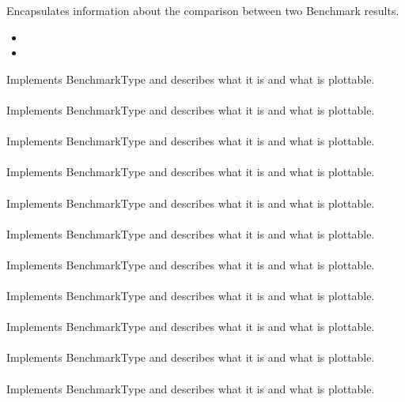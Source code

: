 {Encapsulates information about the comparison between two Benchmark results.}
{
  \begin{itemize}
    \item {}
    \item {}
  \end{itemize}
}

{Implements BenchmarkType and describes what it is and what is plottable.}
{\\}{\\}
{Implements BenchmarkType and describes what it is and what is plottable.}
{\\}{\\}
{Implements BenchmarkType and describes what it is and what is plottable.}
{\\}{\\}
{Implements BenchmarkType and describes what it is and what is plottable.}
{\\}{\\}
{Implements BenchmarkType and describes what it is and what is plottable.}
{\\}{\\}
{Implements BenchmarkType and describes what it is and what is plottable.}
{\\}{\\}
{Implements BenchmarkType and describes what it is and what is plottable.}
{\\}{\\}
{Implements BenchmarkType and describes what it is and what is plottable.}
{\\}{\\}
{Implements BenchmarkType and describes what it is and what is plottable.}
{\\}{\\}
{Implements BenchmarkType and describes what it is and what is plottable.}
{\\}{\\}
{Implements BenchmarkType and describes what it is and what is plottable.}
{\\}{\\}


